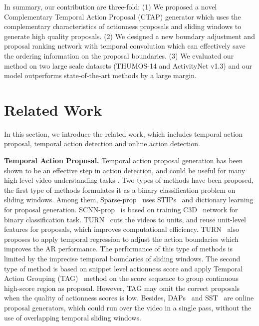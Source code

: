 \documentclass[runningheads]{llncs}
\begin{document}
In summary, our contribution are three-fold:
(1) We proposed a novel Complementary Temporal Action Proposal (CTAP) generator which uses the complementary characteristics of actionness proposals and sliding windows to generate high quality proposals.
(2) We designed a new boundary adjustment and proposal ranking network with temporal convolution which can effectively save the ordering information on the proposal boundaries.
(3) We evaluated our method on two large scale datasets (THUMOS-14 and ActivityNet v1.3) and our model outperforms state-of-the-art methods by a large margin.

\section{Related Work}\label{sec: related work}
In this section, we introduce the related work, which includes temporal action proposal, temporal action detection and online action detection.

\textbf{Temporal Action Proposal.} Temporal action proposal generation has been shown to be an effective step in action detection, and could be useful for many high level video understanding tasks \cite{Shou_2016_CVPR,gao2017cascaded,Gao_2018_CVPR}. Two types of methods have been proposed, the first type of methods formulates it as a binary classification problem on sliding windows. Among them, Sparse-prop~\cite{Heilbron_2016_CVPR} uses STIPs~\cite{laptev2005space} and dictionary learning for proposal generation. SCNN-prop~\cite{Shou_2016_CVPR} is based on training C3D~\cite{tran2015learning} network for binary classification task. TURN~\cite{Gao_2017_ICCV} cuts the videos to units, and reuse unit-level features for proposals, which improves computational efficiency. TURN~\cite{Gao_2017_ICCV} also proposes to apply temporal regression to adjust the action boundaries which improves the AR performance. The performance of this type of methods is limited by the imprecise temporal boundaries of sliding windows. The second type of method is based on snippet level actionness score and apply Temporal Action Grouping (TAG)~\cite{Zhao_2017_ICCV} method on the score sequence to group continuous high-score region as proposal. However, TAG may omit the correct proposals when the quality of actionness scores is low. Besides, DAPs~\cite{escorcia2016daps} and SST~\cite{Buch_2017_CVPR} are online proposal generators, which could run over the video in a single pass, without the use of overlapping temporal sliding windows.
\end{document}
